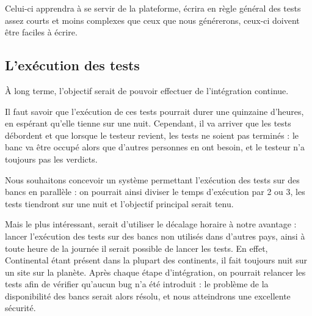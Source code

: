 		Celui-ci apprendra à se servir de la plateforme, écrira en règle général des tests assez courts et moins complexes que ceux que nous générerons, ceux-ci doivent être faciles à écrire.

	\subsection{L'exécution des tests}
	À long terme, l'objectif serait de pouvoir effectuer de l'intégration continue. 

	Il faut savoir que l'exécution de ces tests pourrait durer une quinzaine d'heures, en espérant qu'elle tienne sur une nuit. Cependant, il va arriver que les tests débordent et que lorsque le testeur revient, les tests ne soient pas terminés : le banc va être occupé alors que d'autres personnes en ont besoin, et le testeur n'a toujours pas les verdicts.

	 Nous souhaitons concevoir un système permettant l'exécution des tests sur des bancs en parallèle : on pourrait ainsi diviser le temps d'exécution par 2 ou 3, les tests tiendront sur une nuit et l'objectif principal serait tenu.

	 Mais le plus intéressant, serait d'utiliser le décalage horaire à notre avantage : lancer l'exécution des tests sur des bancs non utilisés dans d'autres pays, ainsi à toute heure de la journée il serait possible de lancer les tests. En effet, Continental étant présent dans la plupart des continents, il fait toujours nuit sur un site sur la planète. Après chaque étape d'intégration, on pourrait relancer les tests afin de vérifier qu'aucun bug n'a été introduit : le problème de la disponibilité des bancs serait alors résolu, et nous atteindrons une excellente sécurité.

